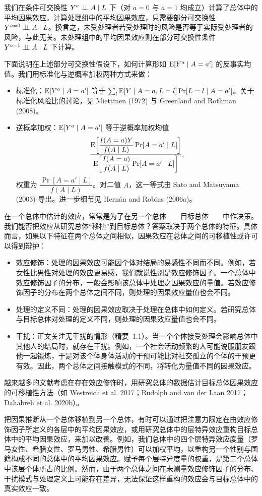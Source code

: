 \begin{techpoint}[计算处理组中的效应]
我们在条件可交换性 $Y^a\perp\!\!\!\perp A\mid L$ 下（对 $a=0$ 与 $a=1$ 均成立）计算了总体中的平均因果效应。计算处理组中的平均因果效应，只需要部分可交换性 $Y^{a=0}\perp\!\!\!\perp A\mid L$。换言之，未受处理者若受处理时的风险是否等于实际受处理者的风险，与此无关。未处理组中的平均因果效应则在部分可交换性条件 $Y^{a=1}\perp\!\!\!\perp A\mid L$ 下计算。

下面说明在上述部分可交换性假设下，如何计算形如 $\mathrm{E}[Y^a\mid A=a']$ 的反事实均值。我们用标准化与逆概率加权两种方式来做：
\begin{itemize}
\item 标准化：$\mathrm{E}[Y^a\mid A=a']$ 等于 $\sum_l \mathrm{E}[Y\mid A=a,L=l]\Pr[L=l\mid A=a']$。关于标准化风险比的讨论，见 Miettinen (1972) 与 Greenland and Rothman (2008)。
\item 逆概率加权：$\mathrm{E}[Y^a\mid A=a']$ 等于逆概率加权均值
\[
\frac{\mathrm{E}\!\left[\dfrac{I(A=a)Y}{f(A\mid L)}\Pr[A=a'\mid L]\right]}{\mathrm{E}\!\left[\dfrac{I(A=a)}{f(A\mid L)}\Pr[A=a'\mid L]\right]},
\]
权重为 $\dfrac{\Pr[A=a'\mid L]}{f(A\mid L)}$。对二值 $A$，这一等式由 Sato and Matsuyama (2003) 导出。进一步细节见 Hernán and Robins (2006a)。
\end{itemize}
\end{techpoint}

\begin{finepoint}[可移植性]
在一个总体中估计的效应，常常是为了在另一个总体——目标总体——中作决策。我们能否把效应从研究总体“移植”到目标总体？答案取决于两个总体的特征。具体而言，如果以下特征在两个总体之间相似，因果效应在总体之间的可移植性或许可以得到辩护：
\begin{itemize}
\item 效应修饰：处理的因果效应可能因个体对结局的易感性不同而不同。例如，若女性比男性对处理的效应更易感，我们就说性别是效应修饰因子。一个总体中效应修饰因子的分布，一般会影响该总体中处理之因果效应的量值。若效应修饰因子的分布在两个总体之间不同，则处理的因果效应量值也会不同。
\item 处理的定义不同：处理的因果效应取决于处理在总体中如何定义。若研究总体与目标总体对处理的定义不同，则处理的因果效应量值也会不同。
\item 干扰：正文关注无干扰的情形（精要~1.1）。当一个个体接受处理会影响总体中其他人的结局时，就存在干扰。例如，一个社会活动频繁的人可能说服朋友跟他一起锻炼，于是对该个体身体活动的干预可能比对社交孤立的个体的干预更有效。因此，两个总体之间接触模式的不同，将转化为量值不同的因果效应。
\end{itemize}
越来越多的文献考虑在存在效应修饰时，用研究总体的数据估计目标总体因果效应的可移植性方法（如 Westreich et al. 2017；Rudolph and van der Laan 2017；Dahabreh et al. 2020b）。

把因果推断从一个总体移植到另一个总体，有时可以通过把注意力限定在由效应修饰因子所定义的各层中的平均因果效应，或用研究总体中的层特异效应重构目标总体中的平均因果效应，来加以改善。例如，我们总体中的四个层特异效应度量（罗马女性、希腊女性、罗马男性、希腊男性）可以加权平均，以重构另一个性别与国籍构成不同的总体中的平均因果效应。赋予每个层特异度量的权重，是第二个总体中该层个体所占的比例。然而，由于两个总体之间在未测量效应修饰因子的分布、干扰模式与处理定义上可能存在差异，无法保证这样重构的效应会与目标总体中的真实效应一致。
\end{finepoint}

